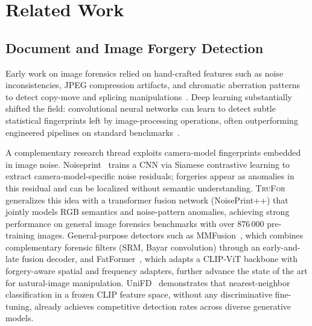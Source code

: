 
\section{Related Work}
\label{sec:related}

\subsection{Document and Image Forgery Detection}

Early work on image forensics relied on hand-crafted features such as noise
inconsistencies, JPEG compression artifacts, and chromatic aberration patterns to
detect copy-move and splicing manipulations~\cite{huh2018fighting}. Deep learning
substantially shifted the field: convolutional neural networks can learn to detect
subtle statistical fingerprints left by image-processing operations, often
outperforming engineered pipelines on standard benchmarks~\cite{bappy2019hybrid,
mantranet2019}.

A complementary research thread exploits camera-model fingerprints embedded in
image noise. Noiseprint~\cite{cozzolino2020noiseprint} trains a CNN via Siamese
contrastive learning to extract camera-model-specific noise residuals; forgeries
appear as anomalies in this residual and can be localized without semantic
understanding. \textsc{TruFor}~\cite{trufor2023} generalizes this idea with a
transformer fusion network (NoisePrint++) that jointly models RGB semantics and
noise-pattern anomalies, achieving strong performance on general image forensics
benchmarks with over 876\,000 pre-training images. General-purpose detectors such
as MMFusion~\cite{mmfusion2024}, which combines complementary forensic filters
(SRM, Bayar convolution) through an early-and-late fusion decoder, and
FatFormer~\cite{fatformer2024}, which adapts a CLIP-ViT backbone with
forgery-aware spatial and frequency adapters, further advance the state of the art
for natural-image manipulation. UniFD~\cite{unifd2023} demonstrates that
nearest-neighbor classification in a frozen CLIP feature space, without any
discriminative fine-tuning, already achieves competitive detection rates across
diverse generative models.

